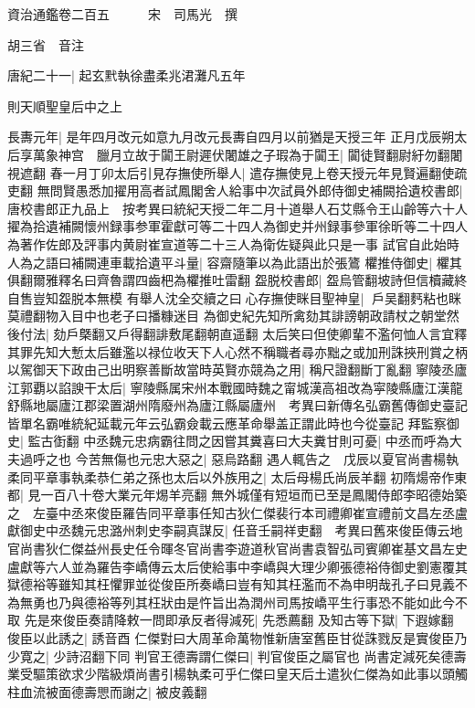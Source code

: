 資治通鑑卷二百五　　　宋　司馬光　撰

胡三省　音注

唐紀二十一|{
	起玄黓執徐盡柔兆涒灘凡五年}


則天順聖皇后中之上

長夀元年|{
	是年四月改元如意九月改元長夀自四月以前猶是天授三年}
正月戊辰朔太后享萬象神宫　臘月立故于闐王尉遲伏闍雄之子瑕為于闐王|{
	闐徒賢翻尉紆勿翻闍視遮翻}
春一月丁卯太后引見存撫使所舉人|{
	遣存撫使見上卷天授元年見賢遍翻使疏吏翻}
無問賢愚悉加擢用高者試鳳閣舍人給事中次試員外郎侍御史補闕拾遺校書郎|{
	唐校書郎正九品上　按考異曰統紀天授二年二月十道舉人石艾縣令王山齡等六十人擢為拾遺補闕懷州録事参軍霍獻可等二十四人為御史并州録事參軍徐昕等二十四人為著作佐郎及評事内黄尉崔宣道等二十三人為衛佐疑與此只是一事}
試官自此始時人為之語曰補闕連車載拾遺平斗量|{
	容齋隨筆以為此語出於張鷟}
欋推侍御史|{
	欋其俱翻爾雅釋名曰齊魯謂四齒杷為欋推吐雷翻}
盌脱校書郎|{
	盌烏管翻坡詩但信櫝藏終自售豈知盌脱本無模}
有舉人沈全交續之曰心存撫使眯目聖神皇|{
	戶吴翻麫粘也眯莫禮翻物入目中也老子曰播糠迷目}
為御史紀先知所禽劾其誹謗朝政請杖之朝堂然後付法|{
	劾戶槩翻又戶得翻誹敷尾翻朝直遥翻}
太后笑曰但使卿輩不濫何恤人言宜釋其罪先知大慙太后雖濫以禄位收天下人心然不稱職者尋亦黜之或加刑誅挾刑賞之柄以駕御天下政由己出明察善斷故當時英賢亦競為之用|{
	稱尺證翻斷丁亂翻}
寧陵丞廬江郭覇以諂諛干太后|{
	寧陵縣属宋州本戰國時魏之甯城漢高祖改為寜陵縣廬江漢龍舒縣地屬廬江郡梁置湖州隋廢州為廬江縣屬廬州　考異曰新傳名弘霸舊傳御史臺記皆單名霸唯統紀延載元年云弘霸僉載云應革命舉盖正謂此時也今從臺記}
拜監察御史|{
	監古衘翻}
中丞魏元忠病霸往問之因嘗其糞喜曰大夫糞甘則可憂|{
	中丞而呼為大夫過呼之也}
今苦無傷也元忠大惡之|{
	惡烏路翻}
遇人輒告之　戊辰以夏官尚書楊執柔同平章事執柔恭仁弟之孫也太后以外族用之|{
	太后母楊氏尚辰羊翻}
初隋煬帝作東都|{
	見一百八十卷大業元年焬羊亮翻}
無外城僅有短垣而已至是鳳閣侍郎李昭德始築之　左臺中丞來俊臣羅告同平章事任知古狄仁傑裴行本司禮卿崔宣禮前文昌左丞盧獻御史中丞魏元忠潞州刺史李嗣真謀反|{
	任音壬嗣祥吏翻　考異曰舊來俊臣傳云地官尚書狄仁傑益州長史任令暉冬官尚書李遊道秋官尚書袁智弘司賓卿崔基文昌左史盧獻等六人並為羅告李嶠傳云太后使給事中李嶠與大理少卿張德裕侍御史劉憲覆其獄德裕等雖知其枉懼罪並從俊臣所奏嶠曰豈有知其枉濫而不為申明哉孔子曰見義不為無勇也乃與德裕等列其枉狀由是忤旨出為潤州司馬按嶠平生行事恐不能如此今不取}
先是來俊臣奏請降敕一問即承反者得減死|{
	先悉薦翻}
及知古等下獄|{
	下遐嫁翻}
俊臣以此誘之|{
	誘音酉}
仁傑對曰大周革命萬物惟新唐室舊臣甘從誅戮反是實俊臣乃少寛之|{
	少詩沼翻下同}
判官王德壽謂仁傑曰|{
	判官俊臣之屬官也}
尚書定減死矣德壽業受驅策欲求少階級煩尚書引楊執柔可乎仁傑曰皇天后土遣狄仁傑為如此事以頭觸柱血流被面德壽愳而謝之|{
	被皮義翻}
